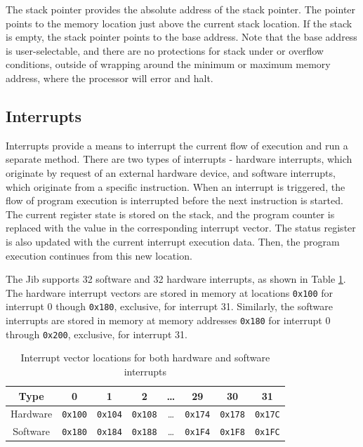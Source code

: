 \documentclass{article}
\begin{document}
The stack pointer provides the absolute address of the stack pointer. The pointer points to the memory location just above the current stack location. If the stack is empty, the stack pointer points to the base address. Note that the base address is user-selectable, and there are no protections for stack under or overflow conditions, outside of wrapping around the minimum or maximum memory address, where the processor will error and halt.

\subsection{Interrupts}

Interrupts provide a means to interrupt the current flow of execution and run a separate method. There are two types of interrupts - hardware interrupts, which originate by request of an external hardware device, and software interrupts, which originate from a specific instruction. When an interrupt is triggered, the flow of program execution is interrupted before the next instruction is started. The current register state is stored on the stack, and the program counter is replaced with the value in the corresponding interrupt vector. The status register is also updated with the current interrupt execution data. Then, the program execution continues from this new location.

The Jib supports 32 software and 32 hardware interrupts, as shown in Table \ref{table:interrupt-vector-locations}. The hardware interrupt vectors are stored in memory at locations \texttt{0x100} for interrupt 0 though \texttt{0x180}, exclusive, for interrupt 31. Similarly, the software interrupts are stored in memory at memory addresses \texttt{0x180} for interrupt 0 through \texttt{0x200}, exclusive, for interrupt 31.

\begin{table}[h!]
    \centering
    \begin{tabular}{c|ccccccc}
        \hline
        Type & 0 & 1 & 2 & \dots & 29 & 30 & 31 \\
        \hline
        Hardware & \texttt{0x100} & \texttt{0x104} & \texttt{0x108} & \dots & \texttt{0x174} & \texttt{0x178} & \texttt{0x17C} \\
        Software & \texttt{0x180} & \texttt{0x184} & \texttt{0x188} & \dots & \texttt{0x1F4} & \texttt{0x1F8} & \texttt{0x1FC} \\
        \hline
    \end{tabular}
    \caption{Interrupt vector locations for both hardware and software interrupts}
    \label{table:interrupt-vector-locations}
\end{table}
\end{document}
